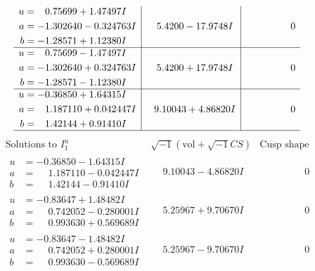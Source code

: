 \documentclass[1p]{elsarticle_modified}
\theoremstyle{definition}
\newcommand{\I}{\sqrt{-1}}
\begin{document}
$$\begin{array}{c|c|c}
\begin{aligned}
u &= \phantom{-}0.75699 + 1.47497 I \\
a &= -1.302640 - 0.324763 I \\
b &= -1.28571 + 1.12380 I\end{aligned}
 & \phantom{-}5.4200 - 17.9748 I & \phantom{-0.000000 } 0 \\ \hline\begin{aligned}
u &= \phantom{-}0.75699 - 1.47497 I \\
a &= -1.302640 + 0.324763 I \\
b &= -1.28571 - 1.12380 I\end{aligned}
 & \phantom{-}5.4200 + 17.9748 I & \phantom{-0.000000 } 0 \\ \hline\begin{aligned}
u &= -0.36850 + 1.64315 I \\
a &= \phantom{-}1.187110 + 0.042447 I \\
b &= \phantom{-}1.42144 + 0.91410 I\end{aligned}
 & \phantom{-}9.10043 + 4.86820 I & \phantom{-0.000000 } 0\\
 \hline 
 \end{array}$$\newpage$$\begin{array}{c|c|c}  
\text{Solutions to }I^u_{1}& \I (\text{vol} + \sqrt{-1}CS) & \text{Cusp shape}\\
 \hline 
\begin{aligned}
u &= -0.36850 - 1.64315 I \\
a &= \phantom{-}1.187110 - 0.042447 I \\
b &= \phantom{-}1.42144 - 0.91410 I\end{aligned}
 & \phantom{-}9.10043 - 4.86820 I & \phantom{-0.000000 } 0 \\ \hline\begin{aligned}
u &= -0.83647 + 1.48482 I \\
a &= \phantom{-}0.742052 - 0.280001 I \\
b &= \phantom{-}0.993630 + 0.569689 I\end{aligned}
 & \phantom{-}5.25967 + 9.70670 I & \phantom{-0.000000 } 0 \\ \hline\begin{aligned}
u &= -0.83647 - 1.48482 I \\
a &= \phantom{-}0.742052 + 0.280001 I \\
b &= \phantom{-}0.993630 - 0.569689 I\end{aligned}
 & \phantom{-}5.25967 - 9.70670 I & \phantom{-0.000000 } 0 \\ \hline\begin{aligned}

\end{aligned}
\end{array}$$
\end{document}
